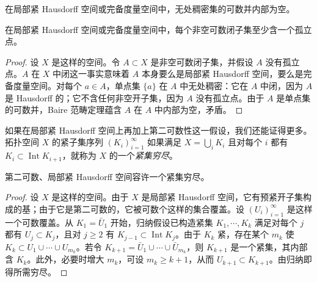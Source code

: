 \documentclass[../../main.tex]{subfiles}
\begin{document}
\begin{theorem}\label{theorem:appA-baire}
在局部紧 Hausdorff 空间或完备度量空间中，无处稠密集的可数并内部为空。
\end{theorem}

\begin{corollary}\label{corollary:appA-baire}
在局部紧 Hausdorff 空间或完备度量空间中，每个非空可数闭子集至少含一个孤立点。
\end{corollary}

\begin{proof}
设 $X$ 是这样的空间。令 $A\subset X$ 是非空可数闭子集，并假设 $A$ 没有孤立点。$A$ 在 $X$ 中闭这一事实意味着 $A$ 本身要么是局部紧 Hausdorff 空间，要么是完备度量空间。对每个 $a\in A$，单点集 $\{a\}$ 在 $A$ 中无处稠密：它在 $A$ 中闭，因为 $A$ 是 Hausdorff 的；它不含任何非空开子集，因为 $A$ 没有孤立点。由于 $A$ 是单点集的可数并，Baire 范畴定理蕴含 $A$ 在 $A$ 中内部为空，矛盾。
\end{proof}

如果在局部紧 Hausdorff 空间上再加上第二可数性这一假设，我们还能证得更多。拓扑空间 $X$ 的紧子集序列 $(K_i)_{i=1}^\infty$ 如果满足 $X=\bigcup_iK_i$ 且对每个 $i$ 都有 $K_i\subset\operatorname{Int}K_{i+1}$，就称为 $X$ 的一个\emph{紧集穷尽}。

\begin{proposition}\label{proposition:appA-exhaustion}
第二可数、局部紧 Hausdorff 空间容许一个紧集穷尽。
\end{proposition}

\begin{proof}
设 $X$ 是这样的空间。由于 $X$ 是局部紧 Hausdorff 空间，它有预紧开子集构成的基；由于它是第二可数的，它被可数个这样的集合覆盖。设 $(U_i)_{i=1}^\infty$ 是这样一个可数覆盖。从 $K_1=\bar U_1$ 开始，归纳假设已构造紧集 $K_1,\cdots ,K_k$ 满足对每个 $j$ 都有 $U_j\subset K_j$，且对 $j\geqslant2$ 有 $K_{j-1}\subset\operatorname{Int}K_j$。由于 $K_k$ 紧，存在某个 $m_k$ 使 $K_k\subset U_1\cup\cdots\cup U_{m_k}$。若令 $K_{k+1}=\bar U_1\cup\cdots\cup\bar U_{m_k}$，则 $K_{k+1}$ 是一个紧集，其内部含 $K_k$。此外，必要时增大 $m_k$，可设 $m_k\geqslant k+1$，从而 $U_{k+1}\subset K_{k+1}$。由归纳即得所需穷尽。
\end{proof}
\end{document}
